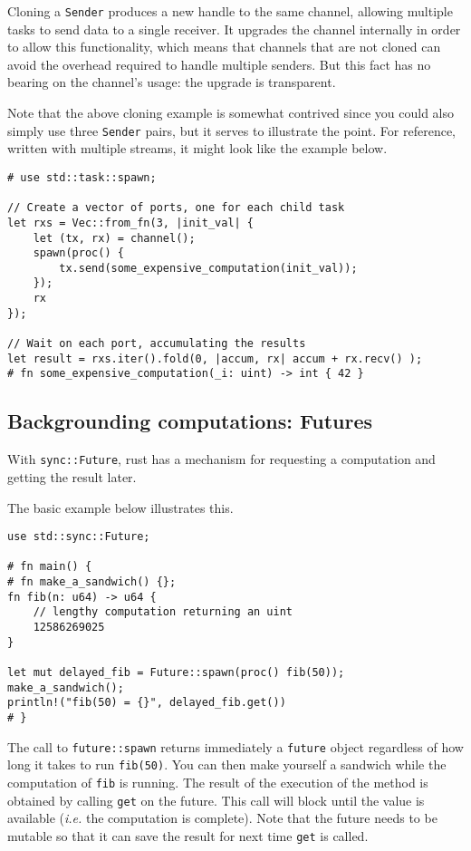 \documentclass[]{article}
\begin{document}
Cloning a \texttt{Sender} produces a new handle to the same channel,
allowing multiple tasks to send data to a single receiver. It upgrades
the channel internally in order to allow this functionality, which means
that channels that are not cloned can avoid the overhead required to
handle multiple senders. But this fact has no bearing on the channel's
usage: the upgrade is transparent.

Note that the above cloning example is somewhat contrived since you
could also simply use three \texttt{Sender} pairs, but it serves to
illustrate the point. For reference, written with multiple streams, it
might look like the example below.

\begin{verbatim}
# use std::task::spawn;

// Create a vector of ports, one for each child task
let rxs = Vec::from_fn(3, |init_val| {
    let (tx, rx) = channel();
    spawn(proc() {
        tx.send(some_expensive_computation(init_val));
    });
    rx
});

// Wait on each port, accumulating the results
let result = rxs.iter().fold(0, |accum, rx| accum + rx.recv() );
# fn some_expensive_computation(_i: uint) -> int { 42 }
\end{verbatim}

\subsection{Backgrounding computations:
Futures}\label{backgrounding-computations-futures}

With \texttt{sync::Future}, rust has a mechanism for requesting a
computation and getting the result later.

The basic example below illustrates this.

\begin{verbatim}
use std::sync::Future;

# fn main() {
# fn make_a_sandwich() {};
fn fib(n: u64) -> u64 {
    // lengthy computation returning an uint
    12586269025
}

let mut delayed_fib = Future::spawn(proc() fib(50));
make_a_sandwich();
println!("fib(50) = {}", delayed_fib.get())
# }
\end{verbatim}

The call to \texttt{future::spawn} returns immediately a \texttt{future}
object regardless of how long it takes to run \texttt{fib(50)}. You can
then make yourself a sandwich while the computation of \texttt{fib} is
running. The result of the execution of the method is obtained by
calling \texttt{get} on the future. This call will block until the value
is available (\emph{i.e.} the computation is complete). Note that the
future needs to be mutable so that it can save the result for next time
\texttt{get} is called.
\end{document}
